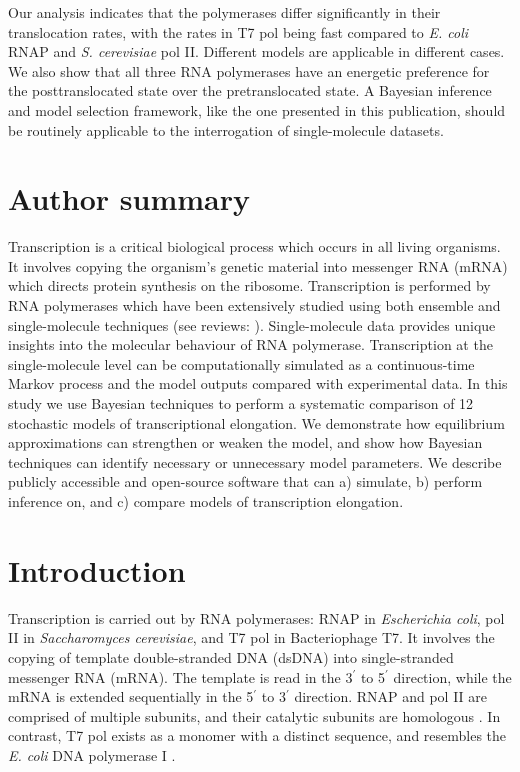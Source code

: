 \documentclass[10pt,letterpaper]{article}
\begin{document}
Our analysis indicates that the polymerases differ significantly in their translocation rates, with the rates in T7 pol being fast compared to {\it E. coli} RNAP and {\it S. cerevisiae} pol II. Different models are applicable in different cases. We also show that all three RNA polymerases have an energetic preference for the posttranslocated state over the pretranslocated state. A Bayesian inference and model selection framework, like the one presented in this publication, should be routinely applicable to the interrogation of single-molecule datasets.


\section*{Author summary}

Transcription is a critical biological process which occurs in all living organisms. It involves copying the organism's genetic material into messenger RNA (mRNA) which directs protein synthesis on the ribosome. Transcription is performed by RNA polymerases which have been extensively studied using both ensemble and single-molecule techniques (see reviews: \cite{herbert2008single, dangkulwanich2014molecular}). Single-molecule data provides unique insights into the molecular behaviour of RNA polymerase. Transcription at the single-molecule level can be computationally simulated as a continuous-time Markov process and the model outputs compared with experimental data. In this study we use Bayesian techniques to perform a systematic comparison of 12 stochastic models of transcriptional elongation. We demonstrate how equilibrium approximations can strengthen or weaken the model, and show how Bayesian techniques can identify necessary or unnecessary model parameters. We describe publicly accessible and open-source software that can a) simulate, b) perform inference on, and c) compare models of transcription elongation. 


\linenumbers

\section*{Introduction}
Transcription is carried out by RNA polymerases: RNAP in \textit{Escherichia coli}, pol II in {\it Saccharomyces cerevisiae}, and T7 pol in Bacteriophage T7. It involves the copying of template double-stranded DNA (dsDNA) into single-stranded messenger RNA (mRNA). The template is read in the 3$^\prime$ to 5$^\prime$ direction, while the mRNA is extended sequentially in the 5$^\prime$ to 3$^\prime$ direction. RNAP and pol II are  comprised of multiple subunits, and their catalytic subunits are homologous \cite{sweetser1987prokaryotic, sosunov2003unified}. In contrast, T7 pol exists as a monomer with a distinct sequence, and resembles  the {\it E. coli} DNA polymerase I \cite{sousa1993crystal}.  \par
\end{document}
